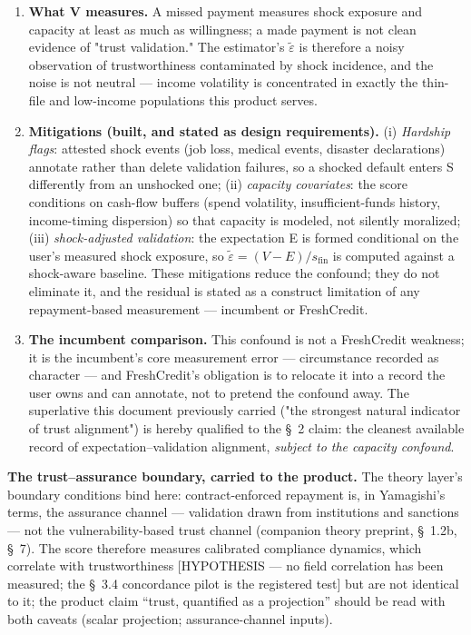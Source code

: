 \documentclass[11pt,twocolumn]{article}
\begin{document}
\begin{enumerate}
\item \textbf{What V measures.} A missed payment measures shock exposure and capacity at least as much as willingness; a made payment is not clean evidence of "trust validation." The estimator's $\tilde{\varepsilon}$ is therefore a noisy observation of trustworthiness contaminated by shock incidence, and the noise is not neutral --- income volatility is concentrated in exactly the thin-file and low-income populations this product serves.
\item \textbf{Mitigations (built, and stated as design requirements).} (i) \emph{Hardship flags}: attested shock events (job loss, medical events, disaster declarations) annotate rather than delete validation failures, so a shocked default enters S differently from an unshocked one; (ii) \emph{capacity covariates}: the score conditions on cash-flow buffers (spend volatility, insufficient-funds history, income-timing dispersion) so that capacity is modeled, not silently moralized; (iii) \emph{shock-adjusted validation}: the expectation E is formed conditional on the user's measured shock exposure, so $\tilde{\varepsilon} = (V - E)/s_{\mathrm{fin}}$ is computed against a shock-aware baseline. These mitigations reduce the confound; they do not eliminate it, and the residual is stated as a construct limitation of any repayment-based measurement --- incumbent or FreshCredit.
\item \textbf{The incumbent comparison.} This confound is not a FreshCredit weakness; it is the incumbent's core measurement error --- circumstance recorded as character --- and FreshCredit's obligation is to relocate it into a record the user owns and can annotate, not to pretend the confound away. The superlative this document previously carried ("the strongest natural indicator of trust alignment") is hereby qualified to the \S~2 claim: the cleanest available record of expectation--validation alignment, \emph{subject to the capacity confound}.
\end{enumerate}

\textbf{The trust--assurance boundary, carried to the product.} The theory layer's boundary conditions bind here: contract-enforced repayment is, in Yamagishi's terms, the assurance channel --- validation drawn from institutions and sanctions --- not the vulnerability-based trust channel (companion theory preprint, \S~1.2b, \S~7). The score therefore measures calibrated compliance dynamics, which correlate with trustworthiness [HYPOTHESIS --- no field correlation has been measured; the \S~3.4 concordance pilot is the registered test] but are not identical to it; the product claim ``trust, quantified as a projection'' should be read with both caveats (scalar projection; assurance-channel inputs).
\end{document}
